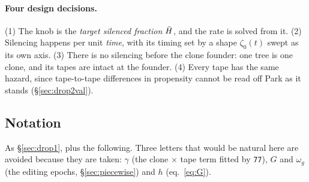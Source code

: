 \paragraph{Four design decisions.} (1) The knob is the \emph{target silenced fraction} $\bar H$, and
the rate is solved from it. (2) Silencing happens per unit \emph{time}, with its timing set by a shape
$\zeta_0(t)$ swept as its own axis. (3) There is no silencing before the clone founder: one tree is
one clone, and its tapes are intact at the founder. (4) Every tape has the same hazard, since
tape-to-tape differences in propensity cannot be read off Park as it stands (\S\ref{sec:drop2val}).

\subsection*{Notation}

As \S\ref{sec:drop1}, plus the following. Three letters that would be natural here are avoided
because they are taken: $\gamma$ (the clone $\times$ tape term fitted by \texttt{77}), $G$ and
$\omega_g$ (the editing epochs, \S\ref{sec:piecewise}) and $h$ (eq.~\eqref{eq:G}).

